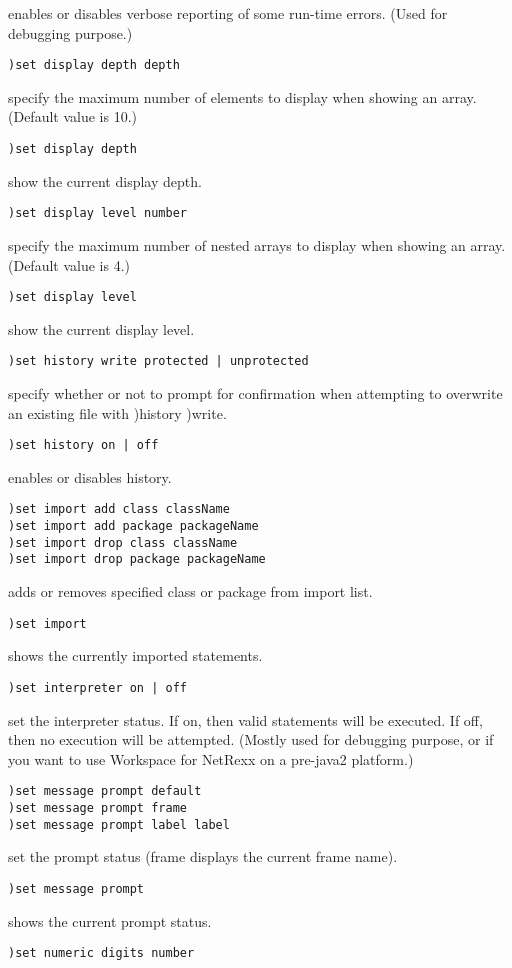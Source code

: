 enables or disables verbose reporting of some run-time errors. (Used for debugging purpose.)
\begin{verbatim}
)set display depth depth
\end{verbatim}
specify the maximum number of elements to display when showing an array. (Default value is 10.)
\begin{verbatim}
)set display depth
\end{verbatim}
show the current display depth.
\begin{verbatim}
)set display level number
\end{verbatim}
specify the maximum number of nested arrays to display when showing an array. (Default value is 4.)
\begin{verbatim}
)set display level
\end{verbatim}
show the current display level.
\begin{verbatim}
)set history write protected | unprotected
\end{verbatim}
specify whether or not to prompt for confirmation when attempting to overwrite an existing file with )history )write.
\begin{verbatim}
)set history on | off
\end{verbatim}
enables or disables history.
\begin{verbatim}
)set import add class className
)set import add package packageName
)set import drop class className
)set import drop package packageName
\end{verbatim}
adds or removes specified class or package from import list.
\begin{verbatim}
)set import
\end{verbatim}
shows the currently imported statements.
\begin{verbatim}
)set interpreter on | off
\end{verbatim}
set the interpreter status. If on, then valid statements will be executed. If off, then no execution will be attempted. (Mostly used for debugging purpose, or if you want to use Workspace for NetRexx on a pre-java2 platform.)
\begin{verbatim}
)set message prompt default
)set message prompt frame
)set message prompt label label
\end{verbatim}
set the prompt status (frame displays the current frame name).
\begin{verbatim}
)set message prompt
\end{verbatim}
shows the current prompt status.
\begin{verbatim}
)set numeric digits number
\end{verbatim}
